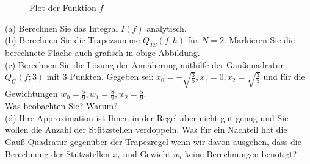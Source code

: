 \documentclass{scrartcl}
\begin{document}
	\begin{figure}[ht]
		\centering
		\caption{Plot der Funktion $f$}
	\end{figure}
	\noindent(a)
	Berechnen Sie das Integral $I(f)$ analytisch.
	\\
	(b)
	Berechnen Sie die Trapezsumme $Q_{TS}(f;h)$ für $N=2$.
	\n 
	Markieren Sie die berechnete Fläche auch grafisch in obige Abbildung.
	\\
	(c)
	Berechnen Sie die Lösung der Annäherung mithilfe der Gaußquadratur $Q_G(f;3)$ mit $3$ Punkten. Gegeben sei:
	$x_0 = -\sqrt{\frac{3}{5}}, x_1 = 0, x_2 = \sqrt{\frac{3}{5}}$ und für die Gewichtungen $w_0 = \frac{5}{9}, w_1 = \frac{8}{9}, w_2 = \frac{5}{9}$. \\
	Was beobachten Sie? Warum?
	\lbreak
	\\
	(d)
	Ihre Approximation ist Ihnen in der Regel aber nicht gut genug und Sie wollen die Anzahl der Stützstellen verdoppeln. Was für ein Nachteil hat die Gauß-Quadratur gegenüber der Trapezregel wenn wir davon ausgehen, dass die Berechnung der Stützstellen $x_i$ und Gewicht $w_i$ keine Berechnungen benötigt?
\end{document}
